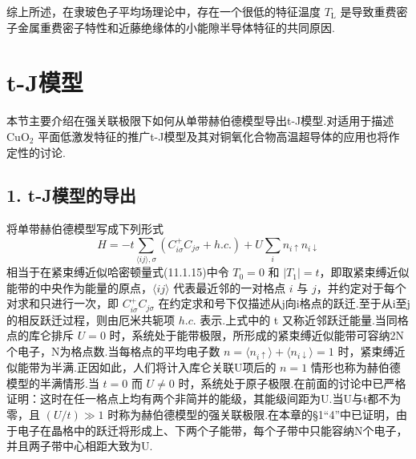 综上所述，在隶玻色子平均场理论中，存在一个很低的特征温度 $T_{\mathrm{L}}$ 是导致重费密子金属重费密子特性和近藤绝缘体的小能隙半导体特征的共同原因.

\section{t-J模型}

本节主要介绍在强关联极限下如何从单带赫伯德模型导出t-J模型.对适用于描述 $\mathrm{CuO_{2}}$ 平面低激发特征的推广t-J模型及其对铜氧化合物高温超导体的应用也将作定性的讨论.

\subsection*{1. t-J模型的导出}

将单带赫伯德模型写成下列形式
\begin{equation}
  H=-t\sum_{\langle ij\rangle,\sigma}(C_{i\sigma}^{+}C_{j\sigma}+h.c.)
  +U\sum_{i}n_{i\uparrow}n_{i\downarrow}
\end{equation}
相当于在紧束缚近似哈密顿量式(11.1.15)中令 $T_{0}=0$ 和 $|T_{1}|=t$，即取紧束缚近似能带的中央作为能量的原点，$\langle ij\rangle$ 代表最近邻的一对格点 $i$ 与 $j$，并约定对于每个对求和只进行一次，即 $C_{i\sigma}^{+}C_{j\sigma}$ 在约定求和号下仅描述从j向i格点的跃迁.至于从i至j的相反跃迁过程，则由厄米共轭项 $h.c.$ 表示.上式中的 t 又称近邻跃迁能量.当同格点的库仑排斥 $U=0$ 时，系统处于能带极限，所形成的紧束缚近似能带可容纳2N个电子，N为格点数.当每格点的平均电子数 $n=\langle n_{i\uparrow}\rangle+\langle n_{i\downarrow}\rangle=1$ 时，紧束缚近似能带为半满.正因如此，人们将计入库仑关联U项后的 $n=1$ 情形也称为赫伯德模型的半满情形.当 $t=0$ 而 $U\neq 0$ 时，系统处于原子极限.在前面的讨论中已严格证明：这时在任一格点上均有两个非简并的能级，其能级间距为U.当U与t都不为零，且 $(U/t)\gg 1$ 时称为赫伯德模型的强关联极限.在本章的§1“4”中已证明，由于电子在晶格中的跃迁将形成上、下两个子能带，每个子带中只能容纳N个电子，并且两子带中心相距大致为U.

